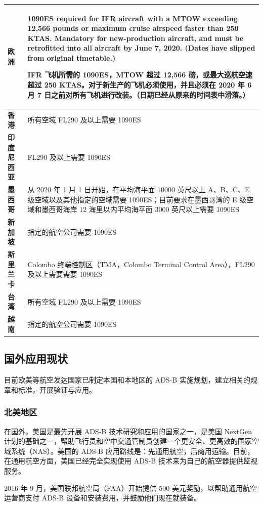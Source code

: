 \begin{table}[htbp]
\begin{tabular}[b]{|p{2cm}<{\raggedleft}|p{13cm}<{\raggedright}|}
\hline
\textbf{欧洲} & 1090ES required for IFR aircraft with a MTOW exceeding 12,566 pounds or maximum cruise airspeed faster than 250 KTAS. Mandatory for new-production aircraft, and must be retrofitted into all aircraft by June 7, 2020. (Dates have slipped from original timetable.)
\par
IFR 飞机所需的 1090ES，MTOW 超过 12,566 磅，或最大巡航空速超过 250 KTAS。对于新生产的飞机必须使用，并且必须在 2020 年 6 月 7 日之前对所有飞机进行改装。（日期已经从原来的时间表中滑落。） \\
\hline
\textbf{香港} & 所有空域 FL290 及以上需要 1090ES \\
\hline
\textbf{印度尼西亚} & FL290 及以上需要 1090ES \\
\hline
\textbf{墨西哥} & 从 2020 年 1 月 1 日开始，在平均海平面 10000 英尺以上 A、B、C、E 级空域以及其他指定的空域需要 1090ES；目前要求在墨西哥湾的 E 级空域和墨西哥海岸 12 海里以内平均海平面 3000 英尺以上需要 1090ES \\
\hline
\textbf{新加坡} & 指定的航空公司需要 1090ES \\
\hline
\textbf{斯里兰卡} & Colombo 终端控制区（TMA，Colombo Terminal Control Area），FL290 及以上需要需要 1090ES \\
\hline
\textbf{台湾} & 所有空域 FL290 及以上需要 1090ES \\
\hline
\textbf{越南} & 指定的航空公司需要 1090ES \\
\hline
\end{tabular}
\end{table}

\subsection{国外应用现状}

目前欧美等航空发达国家已制定本国和本地区的 ADS-B 实施规划，建立相关的规章和标准，开展验证与应用。

\subsubsection{北美地区}

在国外，美国是最先开展 ADS-B 技术研究和应用的国家之一，是美国 NextGen 计划的基础之一，帮助飞行员和空中交通管制员创建一个更安全、更高效的国家空域系统（NAS）。美国的 ADS-B 应用路线是：先通用航空，后商用运输。目前，在通用航空方面，美国已经完全实现使用 ADS-B 技术来为自己的航空器提供监视服务。

2016 年 9 月，美国联邦航空局（FAA）开始提供 500 美元奖励，以帮助通用航空运营商支付 ADS-B 设备和安装费用，并鼓励他们现在就装备。

